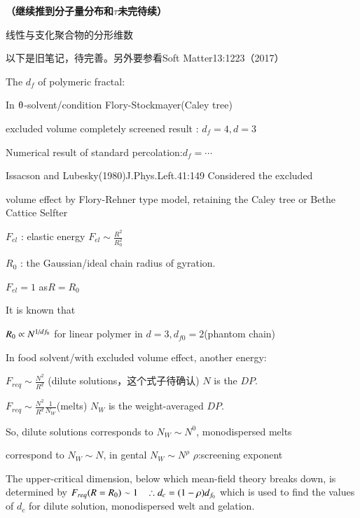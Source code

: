 \documentclass{article} %
\begin{document}
\noindent 
{\bf （继续推到分子量分布和$\tau $未完待续）}

\noindent 线性与支化聚合物的分形维数

\noindent 以下是旧笔记，待完善。另外要参看Soft Matter13:1223（2017）

\noindent The $d_{f} $ of polymeric fractal:

\noindent In   $\thetaup$-solvent/condition                     Flory-Stockmayer(Caley tree) 

\noindent      excluded volume completely screened           result : $d_{f} =4,d=3$

\noindent Numerical result of standard percolation:$d_{f} =\cdots $ 

\noindent Issacson and Lubesky(1980)J.Phys.Left.41:149 Considered the excluded

\noindent volume effect by Flory-Rehner type model, retaining the Caley tree or Bethe Cattice Selfter

\noindent $F_{el} $ : elastic energy $F_{el} \sim \frac{R^{2} }{R_{0}^{2} } $

\noindent $R_{0} $ : the Gaussian/ideal chain radius of gyration.

\noindent $F_{el} =1$ as$R=R_{0} $

\noindent It is known that

\noindent $R_{0} \propto N^{{1\mathord{\left/ {\vphantom {1 df_{0} }} \right. \kern-\nulldelimiterspace} df_{0} } } $ for linear polymer in $d=3,d_{f0} =2$(phantom chain)

\noindent In food solvent/with excluded volume effect, another energy:

\noindent $F_{req} \sim \frac{N^{2} }{R^{d} } $ (dilute solutions，这个式子待确认) $N$ is the $DP$.

\noindent $F_{req} \sim \frac{N^{2} }{R^{d} } \frac{1}{N_{W} } $(melts) $N_{W} $ is the weight-averaged $DP$.

\noindent So, dilute solutions corresponds to $N_{W} \sim N^{0} $, monodispersed melts

\noindent correspond to $N_{W} \sim N$, in gental $N_{W} \sim N^{\rho } $ $\rho $:screening exponent

\noindent 

\noindent The upper-critical dimension, below which mean-field theory breaks down, is determined by $F_{req} (R=R_{0} )\sim 1{\rm \; \; \; }\therefore d_{c} =(1-\rho )d_{f_{0} } $ which is used to find the values of $d_{c} $ for dilute solution, monodispersed welt and gelation.
\end{document}
